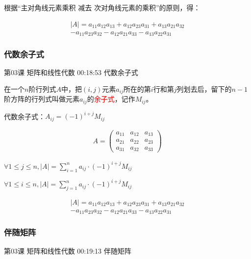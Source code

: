 \documentclass[UTF8]{ctexart}
\begin{document}
根据“主对角线元素乘积 减去 次对角线元素的乘积”的原则，得：

\begin{equation}
\begin{aligned}
|A|=a_{11}a_{12}a_{13}+a_{12}a_{23}a_{31}+a_{13}a_{21}a_{32} \\
-a_{11}a_{23}a_{32}-a_{12}a_{21}a_{33}-a_{13}a_{22}a_{31}
\end{aligned}
\end{equation}

\subsubsection{代数余子式}

第03课 矩阵和线性代数 00:18:53 代数余子式

在一个$n$阶行列式$A$中，把$(i,j)$元素$a_{ij}$所在的第$i$行和第$j$列划去后，留下的$n-1$阶方阵的行列式叫做元素$a_{ij}$的\textcolor{red}{余子式}，记作$M_{ij}$。

代数余子式：$A_{ij}=(-1)^{i+j}M_{ij}$

\begin{equation}
\begin{aligned}
A=
\begin{pmatrix}
a_{11} & a_{12} & a_{13} \\
a_{21} & a_{22} & a_{23} \\
a_{31} & a_{32} & a_{33}
\end{pmatrix}
\end{aligned}
\end{equation}

$\forall 1 \leq j \leq n, |A|= \sum_{i=1}^{n} a_{ij} \cdot (-1)^{i+j} M_{ij}$

$\forall 1 \leq i \leq n, |A|= \sum_{j=1}^{n} a_{ij} \cdot (-1)^{i+j} M_{ij}$

\begin{equation}
\begin{aligned}
|A|=a_{11}a_{12}a_{13}+a_{12}a_{23}a_{31}+a_{13}a_{21}a_{32} \\
-a_{11}a_{23}a_{32}-a_{12}a_{21}a_{33}-a_{13}a_{22}a_{31}
\end{aligned}
\end{equation}

\subsubsection{伴随矩阵}

第03课 矩阵和线性代数 00:19:13 伴随矩阵
\end{document}
